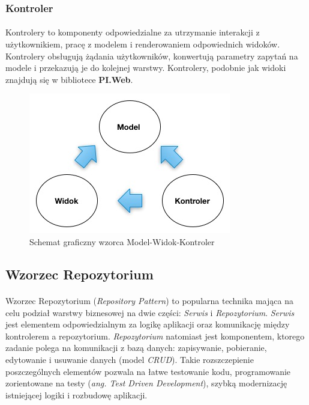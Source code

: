 \subsubsection{Kontroler}
\paragraph{} 
Kontrolery to komponenty odpowiedzialne za utrzymanie interakcji z użytkownikiem, pracę z modelem i renderowaniem odpowiednich widoków. Kontrolery obsługują żądania użytkowników, konwertują parametry zapytań na modele i przekazują je do kolejnej warstwy. Kontrolery, podobnie jak widoki znajdują się w bibliotece \textbf{PI.Web}.  

\newpage
\begin{figure}[ht]
	\centering
		\includegraphics[width=0.75\linewidth]{assets/03_1.jpg}
	\caption{Schemat graficzny wzorca Model-Widok-Kontroler}
	\label{fig:mvc-pic}
\end{figure}

\subsection{Wzorzec Repozytorium} %
\label{sub:wzorzec_repozytorium}
\paragraph{} %
\label{par:}
Wzorzec Repozytorium \cite{rp} (\textit{Repository Pattern}) to popularna technika mająca na celu podział warstwy biznesowej na dwie części: \textit{Serwis} i \textit{Repozytorium}. \textit{Serwis} jest elementem odpowiedzialnym za logikę aplikacji oraz komunikację między kontrolerem a repozytorium. \textit{Repozytorium} natomiast jest komponentem, ktorego zadanie polega na komunikacji z bazą danych: zapisywanie, pobieranie, edytowanie i usuwanie danych (model \textit{CRUD}). Takie rozszczepienie poszczególnych elementów pozwala na łatwe testowanie kodu, programowanie zorientowane na testy (\textit{ang. Test Driven Development}), szybką modernizację istniejącej logiki i rozbudowę aplikacji.

